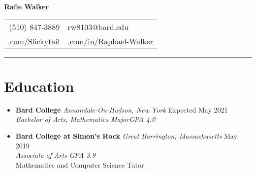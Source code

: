 \documentclass[12pt,letterpaper]{article}
\begin{document}
\begin{center}
	{\LARGE{\textbf{Rafie Walker}}}\\[0.05in]

	\begin{tabular}{r @{\hskip 0.1in}|@{\hskip 0.1in} l}
		(510) 847-3889 & rw8103@bard.edu \\
		 \href{https://github.com/Slickytail}{\faGithub.com/Slickytail} &
		 \href{https://linkedin.com/in/raphael-walker}{\faLinkedinSquare.com/in/Raphael-Walker}
	\end{tabular}
\end{center}
\hrule \vspace{-0.5em}

\section*{Education} \vspace{-0.5em}
\begin{itemize}[label=,itemsep=0pt]
	\item
	\textbf{Bard College} \textit{Annandale-On-Hudson, New York} \hfill Expected May 2021\\
    \textit{Bachelor of Arts, Mathematics Major}\hfill \textit{GPA 4.0}
	\item
	\textbf{Bard College at Simon's Rock} \textit{Great Barrington, Massachusetts} \hfill May 2019\\
	\textit{Associate of Arts} \hfill \textit{GPA 3.9}\\
	Mathematics and Computer Science Tutor
\end{itemize}
\vspace{-2em}
\end{document}
